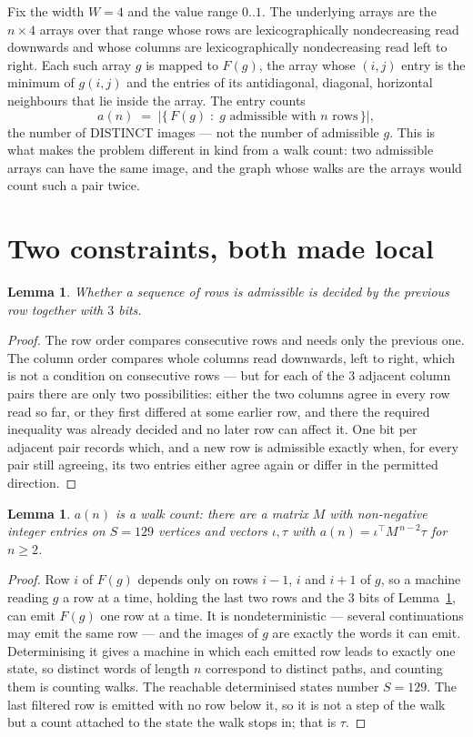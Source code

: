 \documentclass[11pt,a4paper]{article}
\theoremstyle{plain}
\newtheorem{lemma}[theorem]{Lemma}
\theoremstyle{definition}
\begin{document}
Fix the width $W=4$ and the value range $0..1$. The underlying arrays are the
$n\times4$ arrays over that range whose rows are lexicographically nondecreasing read downwards
and whose columns are lexicographically nondecreasing read left to right. Each such array $g$
is mapped to $F(g)$, the array whose $(i,j)$ entry is the minimum of $g(i,j)$ and the entries
of its antidiagonal, diagonal, horizontal neighbours that lie inside the array. The entry counts
\[
a(n)\;=\;\bigl|\{\,F(g)\;:\;g\text{ admissible with }n\text{ rows}\,\}\bigr|,
\]
the number of DISTINCT images --- not the number of admissible $g$. This is what makes the
problem different in kind from a walk count: two admissible arrays can have the same image, and
the graph whose walks are the arrays would count such a pair twice.

\section{Two constraints, both made local}

\begin{lemma}\label{lem:local}
Whether a sequence of rows is admissible is decided by the previous row together with
$3$ bits.
\end{lemma}

\begin{proof}
The row order compares consecutive rows and needs only the previous one. The column order
compares whole columns read downwards, left to right, which is not a condition on consecutive
rows --- but for each of the $3$ adjacent column pairs there are only two possibilities:
either the two columns agree in every row read so far, or they first differed at some earlier
row, and there the required inequality was already decided and no later row can affect it. One
bit per adjacent pair records which, and a new row is admissible exactly when, for every pair
still agreeing, its two entries either agree again or differ in the permitted direction.
\end{proof}

\begin{lemma}\label{lem:det}
$a(n)$ is a walk count: there are a matrix $M$ with non-negative integer entries on $S=129$
vertices and vectors $\iota,\tau$ with $a(n)=\iota^{\!\top}M^{\,n-2}\tau$ for $n\ge2$.
\end{lemma}

\begin{proof}
Row $i$ of $F(g)$ depends only on rows $i-1$, $i$ and $i+1$ of $g$, so a machine reading $g$ a
row at a time, holding the last two rows and the $3$ bits of Lemma~\ref{lem:local}, can
emit $F(g)$ one row at a time. It is nondeterministic --- several continuations may emit the
same row --- and the images of $g$ are exactly the words it can emit. Determinising it gives a
machine in which each emitted row leads to exactly one state, so distinct words of length $n$
correspond to distinct paths, and counting them is counting walks. The reachable determinised
states number $S=129$. The last filtered row is emitted with no row below it, so it is not a
step of the walk but a count attached to the state the walk stops in; that is $\tau$.
\end{proof}
\end{document}
